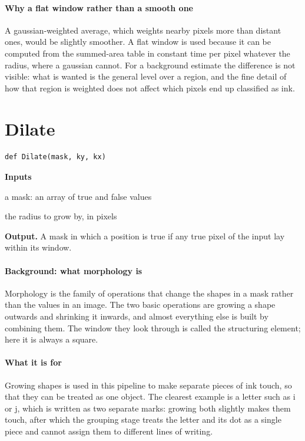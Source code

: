 \paragraph{Why a flat window rather than a smooth one}
A gaussian-weighted average, which weights nearby pixels more than distant ones, would be slightly smoother. A flat window is used because it can be computed from the summed-area table in constant time per pixel whatever the radius, where a gaussian cannot. For a background estimate the difference is not visible: what is wanted is the general level over a region, and the fine detail of how that region is weighted does not affect which pixels end up classified as ink.


\section{Dilate}
\begin{lstlisting}[style=sig]
def Dilate(mask, ky, kx)
\end{lstlisting}

\noindent\textbf{Inputs}
\begin{description}[leftmargin=2.2em,style=nextline,font=\normalfont\ttfamily]\setlength\itemsep{1pt}
  \item[{m}] \normalfont a mask: an array of true and false values
  \item[{r}] \normalfont the radius to grow by, in pixels
\end{description}

\noindent\textbf{Output.} A mask in which a position is true if any true pixel of the input lay within its window.


\paragraph{Background: what morphology is}
Morphology is the family of operations that change the shapes in a mask rather than the values in an image. The two basic operations are growing a shape outwards and shrinking it inwards, and almost everything else is built by combining them. The window they look through is called the structuring element; here it is always a square.


\paragraph{What it is for}
Growing shapes is used in this pipeline to make separate pieces of ink touch, so that they can be treated as one object. The clearest example is a letter such as i or j, which is written as two separate marks: growing both slightly makes them touch, after which the grouping stage treats the letter and its dot as a single piece and cannot assign them to different lines of writing.


